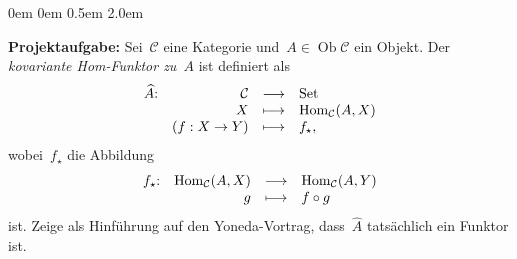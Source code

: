 \documentclass[a4paper,ngerman]{scrartcl}
\theoremstyle{definition}
\theoremstyle{plain}
\theoremstyle{remark}
\newcommand{\C}{\mathcal{C}}
\newcommand{\Hom}{\mathrm{Hom}}
\newcommand{\Set}{\mathrm{Set}}
\DeclareMathOperator{\Ob}{Ob}
\begin{document}
\begin{list}{}{0em \leftmargin0em \itemindent0.5em \itemsep 2.0em}
\small
\item[\textbf{Projektaufgabe:}]
Sei~$\C$ eine Kategorie und~$A \in \Ob \C$ ein Objekt. Der \emph{kovariante
Hom-Funktor zu~$A$} ist definiert als
\[ \begin{array}{@{}rrcl@{}}
  \widehat A{:} & \C &\longrightarrow& \Set \\
  & X &\longmapsto& \Hom_\C(A,X) \\
  & (f: X \to Y) &\longmapsto& f_\star,
\end{array} \]
wobei~$f_\star$ die Abbildung
\[ \begin{array}{@{}rrcl@{}}
  f_\star{:} & \Hom_\C(A,X) &\longrightarrow& \Hom_\C(A,Y) \\
  & g &\longmapsto& f \circ g
\end{array} \]
ist. Zeige als Hinführung auf den Yoneda-Vortrag, dass~$\widehat A$ tatsächlich
ein Funktor ist.
\end{list}
\end{document}

